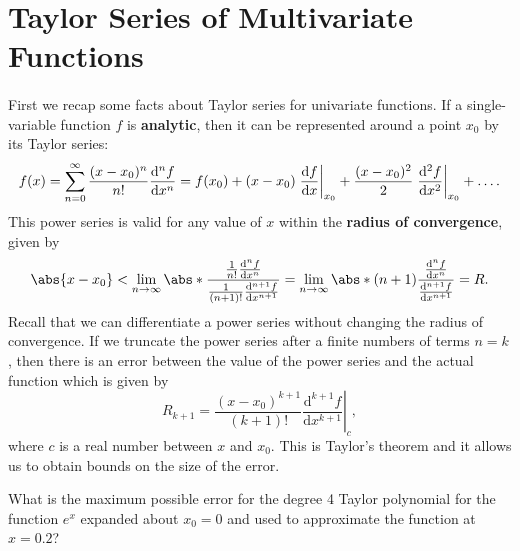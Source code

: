 \documentclass[../multivariate_calculus.tex]{subfiles}
\begin{document}
    \section{Taylor Series of Multivariate Functions}
        \paragraph{}
        First we recap some facts about Taylor series for univariate functions.
        If a single-variable function $f$ is \textbf{analytic}, then it can be represented around a point $x_0$ by its Taylor series:
        \begin{equation}
            f(x)=\sum_{n=0}^\infty\frac{(x-x_0)^n}{n!}\frac{\mathrm{d}^n f}{\mathrm{d}x^n}=f(x_0)+(x-x_0)\left.\dv{f}{x}\right|_{x_0}+\frac{(x-x_0)^2}{2}\left.\dv[2]{f}{x}\right|_{x_0}+\dots.
        \end{equation}
        This power series is valid for any value of $x$ within the \textbf{radius of convergence}, given by
        \begin{equation}
            \abs{x-x_0}<\lim_{n\to\infty}\abs*{\frac{\frac{1}{n!}\frac{\mathrm{d}^n f}{\mathrm{d}x^n}}{\frac{1}{(n+1)!}\frac{\mathrm{d}^{n+1}f}{\mathrm{d}x^{n+1}}}}=\lim_{n\to\infty}\abs*{(n+1)\frac{\frac{\mathrm{d}^n f}{\mathrm{d}x^n}}{\frac{\mathrm{d}^{n+1}f}{\mathrm{d}x^{n+1}}}}=R.
        \end{equation}
        Recall that we can differentiate a power series without changing the radius of convergence.
        If we truncate the power series after a finite numbers of terms $n=k$, then there is an error between the value of the power series and the actual function which is given by
        \begin{equation}
            R_{k+1}=\frac{(x-x_0)^{k+1}}{(k+1)!}\left.\frac{\mathrm{d}^{k+1}f}{\mathrm{d}x^{k+1}}\right|_c,
        \end{equation} 
        where $c$ is a real number between $x$ and $x_0$.
        This is Taylor's theorem and it allows us to obtain bounds on the size of the error.
        \begin{example}
            What is the maximum possible error for the degree 4 Taylor polynomial for the function $e^x$ expanded about $x_0=0$ and used to approximate the function at $x=0.2$?
        \end{example}
\end{document}
